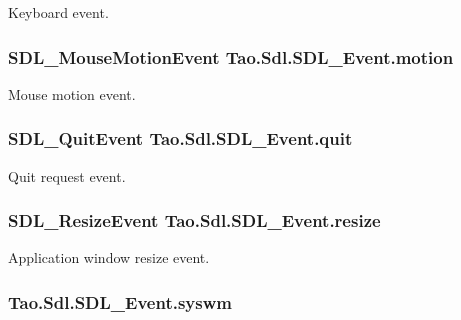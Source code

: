 Keyboard event. 

\hypertarget{struct_tao_1_1_sdl_1_1_s_d_l___event_a9fa1e6078e9d70719f4393ab08643d35}{
\subsubsection[{motion}]{\setlength{\rightskip}{0pt plus 5cm}SDL\_\-MouseMotionEvent {\bf Tao.Sdl.SDL\_\-Event.motion}}}
\label{struct_tao_1_1_sdl_1_1_s_d_l___event_a9fa1e6078e9d70719f4393ab08643d35}


Mouse motion event. 

\hypertarget{struct_tao_1_1_sdl_1_1_s_d_l___event_a1c8931bbb660f0466e3abbf710e70fee}{
\subsubsection[{quit}]{\setlength{\rightskip}{0pt plus 5cm}SDL\_\-QuitEvent {\bf Tao.Sdl.SDL\_\-Event.quit}}}
\label{struct_tao_1_1_sdl_1_1_s_d_l___event_a1c8931bbb660f0466e3abbf710e70fee}


Quit request event. 

\hypertarget{struct_tao_1_1_sdl_1_1_s_d_l___event_abffabebcebe15c4c55dc18509a31292b}{
\subsubsection[{resize}]{\setlength{\rightskip}{0pt plus 5cm}SDL\_\-ResizeEvent {\bf Tao.Sdl.SDL\_\-Event.resize}}}
\label{struct_tao_1_1_sdl_1_1_s_d_l___event_abffabebcebe15c4c55dc18509a31292b}


Application window resize event. 

\hypertarget{struct_tao_1_1_sdl_1_1_s_d_l___event_ad2a3a527da90db6ab869bb6d811c222e}{
\subsubsection[{syswm}]{ {\bf Tao.Sdl.SDL\_\-Event.syswm}}}
\label{struct_tao_1_1_sdl_1_1_s_d_l___event_ad2a3a527da90db6ab869bb6d811c222e}


